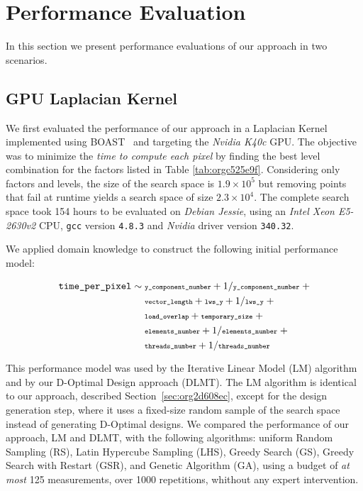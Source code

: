 \documentclass[conference]{IEEEtran}
\begin{document}
\section{Performance Evaluation}
\label{sec:org52ac7d9}
In this section we present performance evaluations of our approach in two
scenarios.
\vspace{-5pt}
\subsection{GPU Laplacian Kernel}
\label{sec:org08d2334}
We first evaluated the performance of our approach in a Laplacian Kernel
implemented using BOAST~\cite{videau2017boast} and targeting the \emph{Nvidia
K40c} GPU. The objective was to minimize the \emph{time to compute each pixel} by
finding the best level combination for the factors listed in Table
\ref{tab:orgc525e9f}. Considering only factors and levels, the size of the
search space is \(1.9\times10^5\) but removing points that fail at runtime yields
a search space of size \(2.3\times10^4\). The complete search space took 154 hours
to be evaluated on \emph{Debian Jessie}, using an \emph{Intel Xeon E5-2630v2} CPU,
\texttt{gcc} version \texttt{4.8.3} and \emph{Nvidia} driver version \texttt{340.32}.

We applied domain knowledge to construct the following initial performance model:
\vspace{-2pt}
\\\begin{minipage}{\linewidth}\scriptsize
\begin{align}
\label{eq:gpu_laplacian_performance_model}
\texttt{time\_per\_pixel} \sim & \scriptsize\; \texttt{y\_component\_number} + 1 / \texttt{y\_component\_number} \; + \nonumber \\
& \scriptsize\; \texttt{vector\_length} + \texttt{lws\_y} + 1 / \texttt{lws\_y} \; + \nonumber \\
& \scriptsize\; \texttt{load\_overlap} + \texttt{temporary\_size} \; + \\
& \scriptsize\; \texttt{elements\_number} + 1 / \texttt{elements\_number} \; + \nonumber \\
& \scriptsize\; \texttt{threads\_number} + 1 /\texttt{threads\_number} \nonumber
\end{align}
\vspace{2pt}
\end{minipage}
This performance model was used by the Iterative Linear Model (LM) algorithm and
by our D-Optimal Design approach (DLMT). The LM algorithm is identical to our
approach, described Section~\ref{sec:org2d608ec}, except
for the design generation step, where it uses a fixed-size random sample of the
search space instead of generating D-Optimal designs. We compared the
performance of our approach, LM and DLMT, with the following algorithms: uniform
Random Sampling (RS), Latin Hypercube Sampling (LHS), Greedy Search (GS), Greedy
Search with Restart (GSR), and Genetic Algorithm (GA), using a budget of \emph{at
most} 125 measurements, over 1000 repetitions, whithout any expert intervention.
\end{document}
